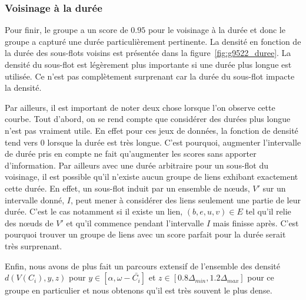 \subsubsection*{Voisinage à la durée}
Pour finir, le groupe a un score de $0.95$ pour le voisinage à la durée et donc le groupe a capturé une durée particulièrement  pertinente.
La densité en fonction de la durée des sous-flots voisins est présentée dans la figure~\ref{fig:g9522_duree}.
La densité du sous-flot est légèrement plus importante si une durée plus longue est utilisée.
Ce n'est pas complètement surprenant car la durée du sous-flot impacte la densité.

Par ailleurs, il est important de noter deux chose lorsque l'on observe cette courbe.
Tout d'abord, on se rend compte que considérer des durées plus longue n'est pas vraiment utile.
En effet pour ces jeux de données, la fonction de densité tend vers $0$ lorsque la durée est très longue.
C'est pourquoi, augmenter l'intervalle de durée pris en compte ne fait qu'augmenter les scores sans apporter d'information.
Par ailleurs avec une durée arbitraire pour un sous-flot du voisinage, il est possible qu'il n'existe aucun groupe de liens exhibant exactement cette durée.
En effet, un sous-flot induit par un ensemble de n\oe uds, $V'$ sur un intervalle donné, $I$, peut mener à considérer des liens seulement une partie de leur durée.
C'est le cas notamment si il existe un lien, $(b,e,u,v) \in E$ tel qu'il relie des n\oe uds de $V'$ et qu'il commence pendant l'intervalle $I$ mais finisse après.
C'est pourquoi trouver un groupe de liens avec un score parfait pour la durée serait très surprenant.

\bigskip

Enfin, nous avons de plus fait un parcours extensif de l'ensemble des densité $d(V(C_i),y,z)$ pour $y \in [\alpha, \omega - \bar{C_i}]$ et $z \in [0.8\Delta_{min}, 1.2\Delta_{max}]$ pour ce groupe en particulier et nous obtenons qu'il est très souvent le plus dense.

